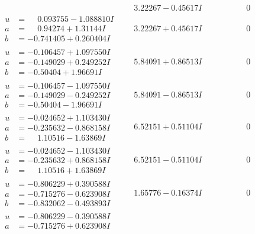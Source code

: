 \documentclass[1p]{elsarticle_modified}
\theoremstyle{definition}
\begin{document}
$$\begin{array}{c|c|c}
 & \phantom{-}3.22267 - 0.45617 I & \phantom{-0.000000 } 0 \\ \hline\begin{aligned}
u &= \phantom{-}0.093755 - 1.088810 I \\
a &= \phantom{-}0.94274 + 1.31144 I \\
b &= -0.741405 + 0.260404 I\end{aligned}
 & \phantom{-}3.22267 + 0.45617 I & \phantom{-0.000000 } 0 \\ \hline\begin{aligned}
u &= -0.106457 + 1.097550 I \\
a &= -0.149029 + 0.249252 I \\
b &= -0.50404 + 1.96691 I\end{aligned}
 & \phantom{-}5.84091 + 0.86513 I & \phantom{-0.000000 } 0 \\ \hline\begin{aligned}
u &= -0.106457 - 1.097550 I \\
a &= -0.149029 - 0.249252 I \\
b &= -0.50404 - 1.96691 I\end{aligned}
 & \phantom{-}5.84091 - 0.86513 I & \phantom{-0.000000 } 0 \\ \hline\begin{aligned}
u &= -0.024652 + 1.103430 I \\
a &= -0.235632 - 0.868158 I \\
b &= \phantom{-}1.10516 - 1.63869 I\end{aligned}
 & \phantom{-}6.52151 + 0.51104 I & \phantom{-0.000000 } 0 \\ \hline\begin{aligned}
u &= -0.024652 - 1.103430 I \\
a &= -0.235632 + 0.868158 I \\
b &= \phantom{-}1.10516 + 1.63869 I\end{aligned}
 & \phantom{-}6.52151 - 0.51104 I & \phantom{-0.000000 } 0 \\ \hline\begin{aligned}
u &= -0.806229 + 0.390588 I \\
a &= -0.715276 - 0.623908 I \\
b &= -0.832062 - 0.493893 I\end{aligned}
 & \phantom{-}1.65776 - 0.16374 I & \phantom{-0.000000 } 0 \\ \hline\begin{aligned}
u &= -0.806229 - 0.390588 I \\
a &= -0.715276 + 0.623908 I \\

\end{aligned}
\end{array}$$
\end{document}
